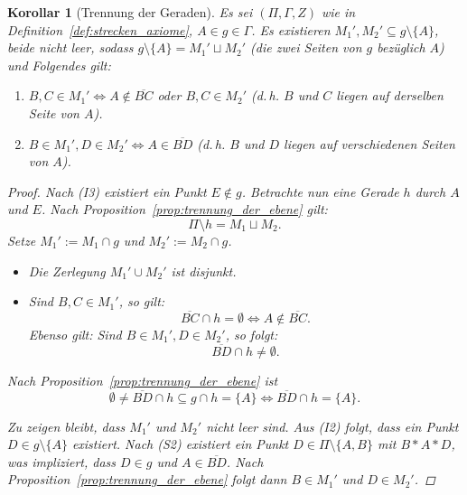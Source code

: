 \documentclass[a4paper,12pt]{article}
\theoremstyle{break}
\newtheorem{corollary}[definition]{Korollar}
\begin{document}
\begin{corollary}[Trennung der Geraden]\label{cor:trennung_geraden}
Es sei $(\Pi, \Gamma, Z)$ wie in Definition~\ref{def:strecken_axiome}, $A \in g \in \Gamma$.  
Es existieren $M_1', M_2' \subseteq g \setminus \{A\}$, beide nicht leer, sodass  
$g \setminus \{A\} = M_1' \sqcup M_2'$ (die zwei Seiten von $g$ bezüglich $A$) und Folgendes gilt:
\begin{enumerate}
    \item $B, C \in M_1' \iff A \notin \overline{BC}$ oder $B, C \in M_2'$ (d.\,h. $B$ und $C$ liegen auf derselben Seite von $A$).
    \item $B \in M_1', D \in M_2' \iff A \in \overline{BD}$ (d.\,h. $B$ und $D$ liegen auf verschiedenen Seiten von $A$).
\end{enumerate}

\begin{proof}
Nach (I3) existiert ein Punkt $E \notin g$. Betrachte nun eine Gerade $h$ durch $A$ und $E$.  
Nach Proposition~\ref{prop:trennung_der_ebene} gilt:
\[
\Pi \setminus h = M_1 \sqcup M_2.
\]
Setze $M_1' := M_1 \cap g$ und $M_2' := M_2 \cap g$.  

\begin{itemize}
    \item Die Zerlegung $M_1' \cup M_2'$ ist disjunkt.
    \item Sind $B, C \in M_1'$, so gilt:
    \[
    \overline{BC} \cap h = \emptyset \iff A \notin \overline{BC}.
    \]
    Ebenso gilt: Sind $B \in M_1', D \in M_2'$, so folgt:
    \[
    \overline{BD} \cap h \neq \emptyset.
    \]
\end{itemize}

Nach Proposition~\ref{prop:trennung_der_ebene} ist
\[
\emptyset \neq \overline{BD} \cap h \subseteq g \cap h = \{A\} \iff \overline{BD} \cap h = \{A\}.
\]

Zu zeigen bleibt, dass $M_1'$ und $M_2'$ nicht leer sind.  
Aus (I2) folgt, dass ein Punkt $D \in g \setminus \{A\}$ existiert. Nach (S2) existiert ein Punkt $D \in \Pi \setminus \{A, B\}$ mit $B * A * D$, was impliziert, dass $D \in g$ und $A \in \overline{BD}$.  
Nach Proposition~\ref{prop:trennung_der_ebene} folgt dann $B \in M_1'$ und $D \in M_2'$.  
\end{proof}
\end{corollary}
\end{document}
